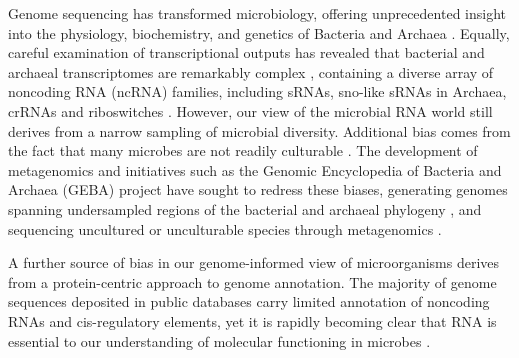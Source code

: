\documentclass[10pt]{article}
\begin{document}
Genome sequencing has transformed microbiology, offering unprecedented
insight into the physiology, biochemistry, and genetics of Bacteria
and Archaea \cite{Wu:2009,Rinke:2013,Loman:2012,Chun:2014}. Equally,
careful examination of transcriptional outputs has revealed that
bacterial and archaeal transcriptomes are remarkably complex
\cite{Sorek:2011}, containing a diverse array of noncoding RNA (ncRNA)
families, including sRNAs, sno-like sRNAs in Archaea, crRNAs and
riboswitches
\cite{Storz:2011,Dennis:2001,Horvath:2010,Breaker:2012,Cech:2014}. However,
our view of the microbial RNA world still derives from a narrow
sampling \cite{Pagani:2012} of microbial diversity. Additional bias
comes from the fact that many microbes are not readily culturable
\cite{Stewart:2012}. The development of metagenomics and initiatives
such as the Genomic Encyclopedia of Bacteria and Archaea (GEBA)
project have sought to redress these biases, generating genomes
spanning undersampled regions of the bacterial and archaeal phylogeny
\cite{Wu:2009}, and sequencing uncultured or unculturable species
through metagenomics \cite{Elkins:2008,Konneke:2005,Tyson:2004,Woyke:2006,Rinke:2013}.

A further source of bias in our genome-informed view of microorganisms
derives from a protein-centric approach to genome annotation. The
majority of genome sequences deposited in public databases carry
limited annotation of noncoding RNAs and cis-regulatory elements, yet
it is rapidly becoming clear that RNA is essential to our
understanding of molecular functioning in microbes \cite{mandin2013rna}. 
\end{document}
